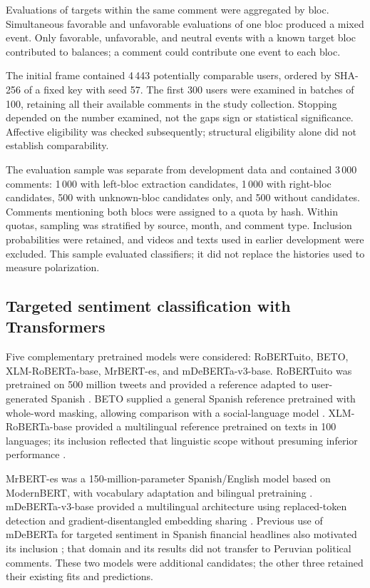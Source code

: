 \documentclass[conference, letterpaper]{IEEEtran}
\begin{document}
Evaluations of targets within the same comment were aggregated by bloc. Simultaneous favorable and unfavorable evaluations of one bloc produced a mixed event. Only favorable, unfavorable, and neutral events with a known target bloc contributed to balances; a comment could contribute one event to each bloc.

The initial frame contained 4\,443 potentially comparable users, ordered by SHA-256 of a fixed key with seed 57. The first 300 users were examined in batches of 100, retaining all their available comments in the study collection. Stopping depended on the number examined, not the gap\textquotesingle s sign or statistical significance. Affective eligibility was checked subsequently; structural eligibility alone did not establish comparability.

The evaluation sample was separate from development data and contained 3\,000 comments: 1\,000 with left-bloc extraction candidates, 1\,000 with right-bloc candidates, 500 with unknown-bloc candidates only, and 500 without candidates. Comments mentioning both blocs were assigned to a quota by hash. Within quotas, sampling was stratified by source, month, and comment type. Inclusion probabilities were retained, and videos and texts used in earlier development were excluded. This sample evaluated classifiers; it did not replace the histories used to measure polarization.

\subsection{Targeted sentiment classification with Transformers}

Five complementary pretrained models were considered: RoBERTuito, BETO, XLM-RoBERTa-base, MrBERT-es, and mDeBERTa-v3-base. RoBERTuito was pretrained on 500 million tweets and provided a reference adapted to user-generated Spanish \cite{robertuito}. BETO supplied a general Spanish reference pretrained with whole-word masking, allowing comparison with a social-language model \cite{BETOResource}. XLM-RoBERTa-base provided a multilingual reference pretrained on texts in 100 languages; its inclusion reflected that linguistic scope without presuming inferior performance \cite{XLMR2020}.

MrBERT-es was a 150-million-parameter Spanish/English model based on ModernBERT, with vocabulary adaptation and bilingual pretraining \cite{MrBERT2026,MrBERTesResource}. mDeBERTa-v3-base provided a multilingual architecture using replaced-token detection and gradient-disentangled embedding sharing \cite{DeBERTaV32023,mDeBERTaResource}. Previous use of mDeBERTa for targeted sentiment in Spanish financial headlines also motivated its inclusion \cite{SINAI2023FinancES}; that domain and its results did not transfer to Peruvian political comments. These two models were additional candidates; the other three retained their existing fits and predictions.
\end{document}
